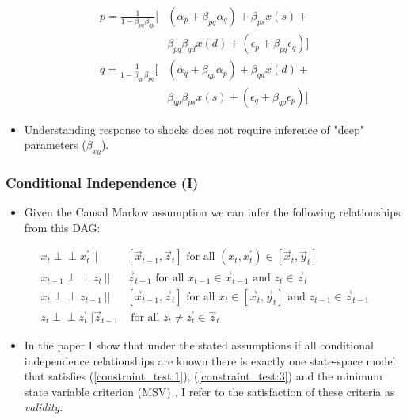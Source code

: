 \documentclass{beamer}
\def\indep{\perp \!\!\! \perp}
\begin{document}
\begin{frame}
\begin{minipage}{0.4\textwidth}
\begin{figure}
        \end{figure}
        \tiny
        \begin{align*}
            p = \frac{1}{1-\beta_{pq}\beta_{qp}}[& (\alpha_p + \beta_{pq} \alpha_q) + \beta_{ps} x(s) + \\ & \beta_{pq} \beta_{qd} x(d) + (\epsilon_p + \beta_{pq} \epsilon_q)] \\
            q = \frac{1}{1-\beta_{qp}\beta_{pq}}[& (\alpha_q + \beta_{qp} \alpha_p) + \beta_{qd} x(d) + \\ & \beta_{qp} \beta_{ps} x(s) + (\epsilon_q + \beta_{qp} \epsilon_p)]
        \end{align*}
    \end{minipage}
    \begin{itemize}
        \item Understanding response to shocks does not require inference of "deep" parameters ($\beta_{xy}$).
    \end{itemize}
\end{frame}

\begin{frame}
    \frametitle{Conditional Independence (I)}
    \begin{itemize}
        \item Given the Causal Markov assumption we can infer the following relationships from this DAG: 
    \end{itemize}
    \begin{align}
        x_t \indep x^{\prime}_{t} \,||\,& [\vec{x}_{t-1},\vec{z}_t] \text{ for all } (x_t, x^{\prime}_{t}) \in [\vec{x}_t, \vec{y}_t] \label{constraint_test:1} \\
        x_{t-1} \indep z_{t} \,||\,& \vec{z}_{t-1} \text{ for all } x_{t-1} \in \vec{x}_{t-1} \text{ and } z_{t} \in \vec{z}_t \label{constraint_test:3} \\
        x_t \indep z_{t-1} \,||\,& [\vec{x}_{t-1}, \vec{z}_t] \text{ for all } x_t \in [\vec{x}_t, \vec{y}_t] \text{ and } z_{t-1} \in \vec{z}_{t-1} \label{constraint_test:2} \\
        z_t \indep z^{\prime}_{t} || \vec{z}_{t-1} & \text{ for all } z_t \not = z^{\prime}_{t} \in \vec{z}_t \label{constraint_test:4}
      \end{align}
    \begin{itemize}
        \item In the paper I show that under the stated assumptions if all conditional independence relationships are known there is exactly one state-space model that satisfies (\ref{constraint_test:1}), (\ref{constraint_test:3}) and the minimum state variable criterion (MSV) \parencite{mccallum1999role}. I refer to the satisfaction of these criteria as \textit{validity}.
    \end{itemize}
\end{frame}
\end{document}

